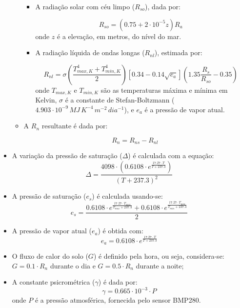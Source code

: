 \begin{itemize}
\begin{itemize}
\begin{itemize}
            \item A radiação solar com céu limpo (\(R_{so}\)), dada por:
            
            \[
            R_{so} = (0.75 + 2 \cdot 10^{-5} z) R_a
            \]
            onde \(z\) é a elevação, em metros, do nível do mar.
            
            \item A radiação líquida de ondas longas (\(R_{nl}\)), estimada por:
            
            \[
            R_{nl} = \sigma \left( \frac{T_{max,K}^4 + T_{min,K}^4}{2} \right) \left[ 0.34 - 0.14 \sqrt{e_a} \right] \left( 1.35 \frac{R_s}{R_{so}} - 0.35 \right)
            \]
            onde \(T_{max,K}\) e \(T_{min,K}\) são as temperaturas máxima e mínima em Kelvin, \( \sigma \) é a constante de Stefan-Boltzmann (\(4.903 \cdot 10^{-9} \, MJ \, K^{-4} \, m^{-2} \, dia^{-1} \)), e \(e_a\) é a pressão de vapor atual.
        \end{itemize}

        \item A \(R_n\) resultante é dada por:
        
        \[ R_n = R_{ns} - R_{nl} \]
    \end{itemize}
    
    \item A variação da pressão de saturação (\(\Delta\)) é calculada com a equação:
    \[
    \Delta = \frac{4098 \cdot (0.6108 \cdot e^{\frac{17.27 \cdot T}{T + 237.3}})}{(T + 237.3)^2}
    \]
    
    \item A pressão de saturação (\(e_s\)) é calculada usando-se:
    \[
    e_s = \frac{0.6108 \cdot e^{\frac{17.27 \cdot T_{max}}{T_{max} + 237.3}} + 0.6108 \cdot e^{\frac{17.27 \cdot T_{min}}{T_{min} + 237.3}}}{2}
    \]
    
    \item A pressão de vapor atual (\(e_a\)) é obtida com:
    \[
    e_a = 0.6108 \cdot e^{\frac{17.27 \cdot T}{T + 237.3}}
    \]
    
    \item O fluxo de calor do solo (\(G\)) é definido pela hora, ou seja, considera-se: \(G = 0.1 \cdot R_n\) durante o dia e \(G = 0.5 \cdot R_n\) durante a noite;
    
    \item A constante psicrométrica (\(\gamma\)) é dada por:
    \[
    \gamma = 0.665 \cdot 10^{-3} \cdot P
    \]
    onde \(P\) é a pressão atmosférica, fornecida pelo sensor BMP280.
\end{itemize}

